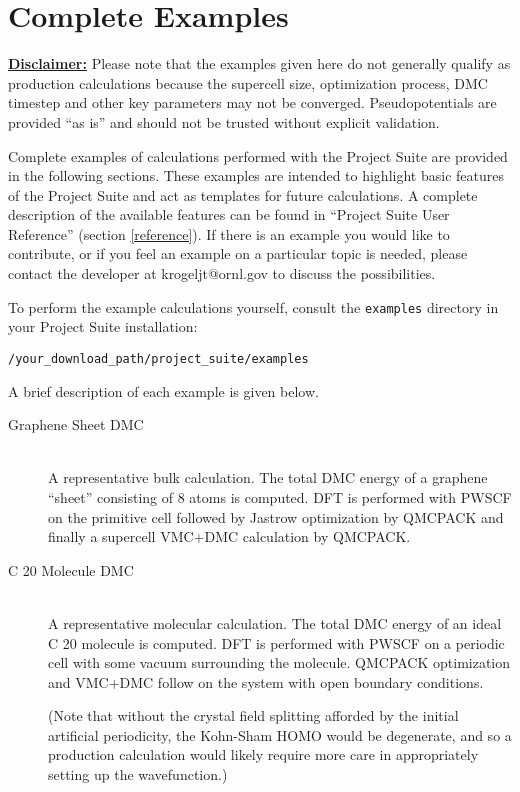 \documentclass[oneside,11pt]{memoir}
\numberwithin{equation}{section}
\newcommand{\bu}[1]{\textbf{\underline{#1}}}
\begin{document}
\pagebreak
\chapter{Complete Examples} \label{examples}

\bu{Disclaimer:} Please note that the examples given here do not generally qualify as production 
calculations because the supercell size, optimization process, DMC timestep and 
other key parameters may not be converged.  Pseudopotentials are provided 
``as is'' and should not be trusted without explicit validation.

Complete examples of calculations performed with the Project Suite are provided 
in the following sections.  These examples are intended to highlight basic 
features of the Project Suite and act as templates for future calculations.  
A complete description of the available features can be found in ``Project 
Suite User Reference'' (section \ref{reference}).  If there is an example you 
would like to contribute, or if you feel an example on a particular topic is 
needed, please contact the developer at krogeljt@ornl.gov to discuss the 
possibilities.  

To perform the example calculations yourself, consult the \texttt{examples} 
directory in your Project Suite installation:
\begin{shaded}
\begin{verbatim}
/your_download_path/project_suite/examples
\end{verbatim}
\end{shaded}
A brief description of each example is given below.  

\begin{description}
  \item[Graphene Sheet DMC] \hfill \\
    A representative bulk calculation.  The total DMC energy of a graphene 
    ``sheet'' consisting of 8 atoms is computed.  DFT is performed with 
    PWSCF on the primitive cell followed by Jastrow optimization by QMCPACK 
    and finally a supercell VMC+DMC calculation by QMCPACK.  

  \item[C 20 Molecule DMC] \hfill  \\
    A representative molecular calculation.  The total DMC energy of an ideal 
    C 20 molecule is computed.  DFT is performed with PWSCF on a periodic cell 
    with some vacuum surrounding the molecule.  QMCPACK optimization and 
    VMC+DMC follow on the system with open boundary conditions.  

    (Note that without the crystal field splitting afforded by the initial 
    artificial periodicity, the Kohn-Sham HOMO would be degenerate, and so a 
    production calculation would likely require more care in appropriately 
    setting up the wavefunction.)
\end{description}
\end{document}
